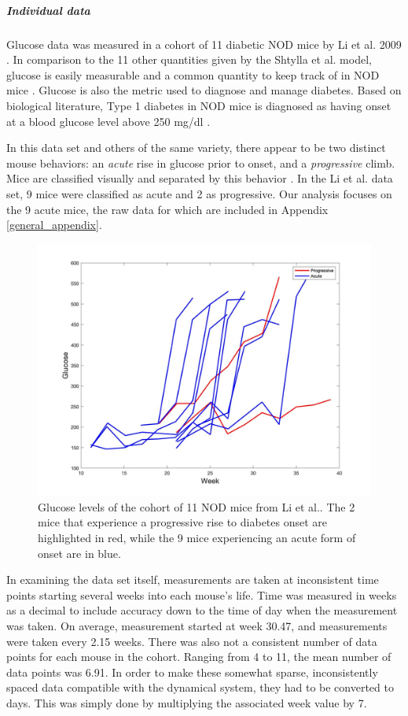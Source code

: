 \subparagraph{Individual data} \label{section:T1D_individual_data}
Glucose data was measured in a cohort of 11 diabetic NOD mice by Li et al. 2009 \cite{Lietal2009}. In comparison to the 11 other quantities given by the Shtylla et al. model, glucose is easily measurable and a common quantity to keep track of in NOD mice \cite{Mathewsetal2015}. Glucose is also the metric used to diagnose and manage diabetes. Based on biological literature, Type 1 diabetes in NOD mice is diagnosed as having onset at a blood glucose level above 250 mg/dl \cite{Mathewsetal2015}.
\par In this data set and others of the same variety, there appear to be two distinct mouse behaviors: an \emph{acute} rise in glucose prior to onset, and a \emph{progressive} climb. Mice are classified visually and separated by this behavior \cite{Mathewsetal2015}. In the Li et al. data set, 9 mice were classified as acute and 2 as progressive. Our analysis focuses on the 9 acute mice, the raw data for which are included in Appendix \ref{general_appendix}.

\begin{figure}[H]
    \centering
    \includegraphics[width=15cm]{Model_Setup_Images/AcuteVersusProgressive.jpg}
    \caption{Glucose levels of the cohort of 11 NOD mice from Li et al.. The 2 mice that experience a progressive rise to diabetes onset are highlighted in red, while the 9 mice experiencing an acute form of onset are in blue.}
    \label{fig:1prob}
\end{figure}

\par In examining the data set itself, measurements are taken at inconsistent time points starting several weeks into each mouse's life. Time was measured in weeks as a decimal to include accuracy down to the time of day when the measurement was taken. On average, measurement started at week 30.47, and measurements were taken every 2.15 weeks. There was also not a consistent number of data points for each mouse in the cohort. Ranging from 4 to 11, the mean number of data points was 6.91. In order to make these somewhat sparse, inconsistently spaced data compatible with the dynamical system, they had to be converted to days. This was simply done by multiplying the associated week value by 7.

